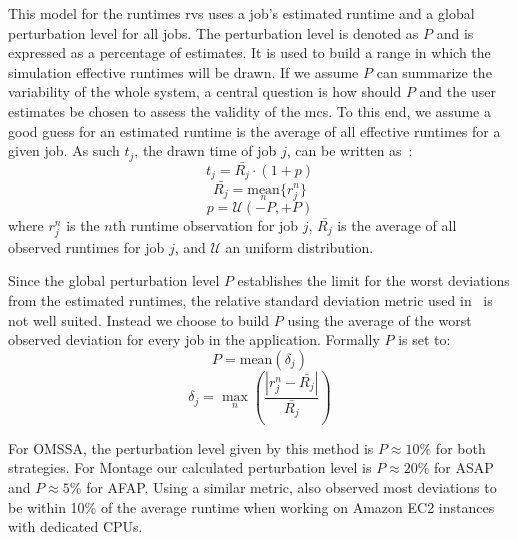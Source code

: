 \documentclass[10pt,conference,compsocconf]{IEEEtran}
\begin{document}
This model for the runtimes \acp{rv} uses a job's estimated runtime and a global
perturbation  level  for  all  jobs.  The perturbation  level is denoted as $P$
and is expressed  as  a percentage of estimates. It is used  to build a range in which the simulation
effective runtimes will be drawn. If we assume $P$ can summarize the variability
of the whole system, a central question is how should $P$ and the user estimates
be chosen to assess the validity of the \ac{mcs}.  To this end, we assume a good
guess for an  estimated runtime is the  average of all effective  runtimes for a
given job. As such $t_j$, the drawn time of job $j$, can be written as~:
\begin{equation}
	t_j = \bar{R_j} \cdot (1 + p)
	\label{eq:t}
\end{equation}
\begin{equation}
	\bar{R_j} = \underset{n}{\textrm{mean}}\{r_j^n\}
\end{equation}
\begin{equation}
	p = \mathcal{U}(-P,+P)
	\label{eq:r}
\end{equation}
where $r_j^n$ is the $n$th runtime observation for job $j$, $\bar{R_j}$ is the
average of all observed runtimes for job $j$, and $\mathcal{U}$ an uniform distribution.

Since the global perturbation level $P$ establishes the limit for the worst
deviations from the estimated runtimes, the relative standard deviation metric
used in~\cite{LeitnerC16} is not well suited. Instead we choose to build $P$
using the average of the worst observed deviation for every job in the
application. Formally $P$ is set to:
\begin{equation}
P = \textrm{mean}(\delta{}_j)
\label{eq:P}
\end{equation}
\begin{equation}
\delta{}_j =
\max_n\left(\frac{|r_j^n-\bar{R_j}|}{\bar{R_j}}\right)
\label{eq:d}
\end{equation}

For OMSSA, the perturbation level given by this method is $P\approx{}10\%$ for both
strategies. For Montage  our calculated perturbation level is  $P\approx{}20\%$
for ASAP and $P\approx{}5\%$ for AFAP. Using a similar metric, \cite{pics} also 
observed most deviations to be within 10\% of the average runtime when working on
Amazon EC2 instances with dedicated CPUs.
\end{document}
